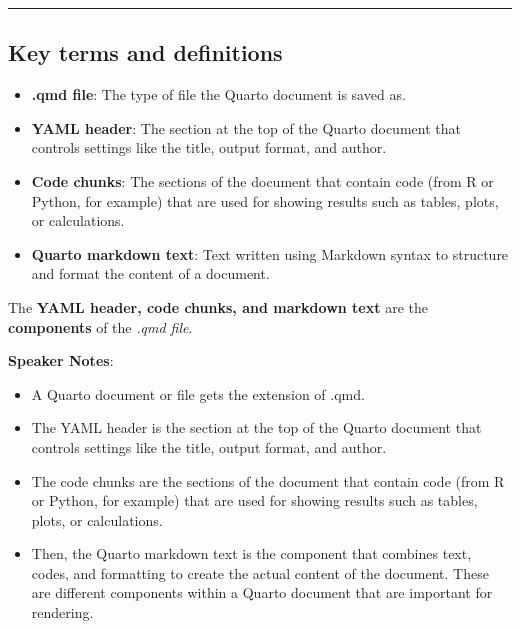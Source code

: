 \documentclass[
  letterpaper,
  DIV=11,
  numbers=noendperiod]{scrartcl}
\providecommand{\tightlist}{%
  \setlength{\itemsep}{0pt}\setlength{\parskip}{0pt}}
\begin{document}
\begin{center}\rule{0.5\linewidth}{0.5pt}\end{center}

\subsection{Key terms and
definitions}\label{key-terms-and-definitions-1}

\begin{itemize}
\tightlist
\item
  \textbf{.qmd file}: The type of file the Quarto document is saved as.
\item
  \textbf{YAML header}: The section at the top of the Quarto document
  that controls settings like the title, output format, and author.
\item
  \textbf{Code chunks}: The sections of the document that contain code
  (from R or Python, for example) that are used for showing results such
  as tables, plots, or calculations.
\item
  \textbf{Quarto markdown text}: Text written using Markdown syntax to
  structure and format the content of a document.
\end{itemize}

\begin{tcolorbox}[enhanced jigsaw, opacitybacktitle=0.6, toptitle=1mm, colbacktitle=quarto-callout-note-color!10!white, toprule=.15mm, left=2mm, colback=white, colframe=quarto-callout-note-color-frame, opacityback=0, bottomtitle=1mm, breakable, titlerule=0mm, rightrule=.15mm, arc=.35mm, title=\textcolor{quarto-callout-note-color}{\faInfo}\hspace{0.5em}{Note}, bottomrule=.15mm, coltitle=black, leftrule=.75mm]

The \textbf{YAML header, code chunks, and markdown text} are the
\textbf{components} of the \emph{.qmd file}.

\end{tcolorbox}

\textbf{Speaker Notes}:

\begin{itemize}
\item
  A Quarto document or file gets the extension of .qmd.
\item
  The YAML header is the section at the top of the Quarto document that
  controls settings like the title, output format, and author.
\item
  The code chunks are the sections of the document that contain code
  (from R or Python, for example) that are used for showing results such
  as tables, plots, or calculations.
\item
  Then, the Quarto markdown text is the component that combines text,
  codes, and formatting to create the actual content of the document.
  These are different components within a Quarto document that are
  important for rendering.
\end{itemize}
\end{document}
